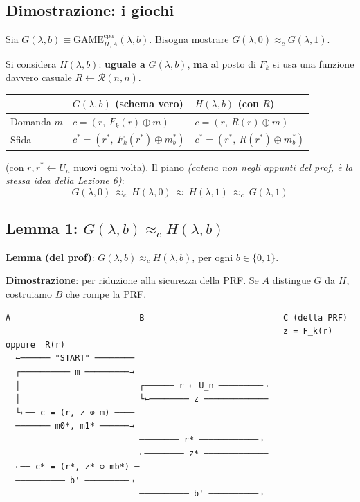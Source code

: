 \subsection{Dimostrazione: i giochi}

Sia \(G(\lambda, b) \equiv \text{GAME}^{\text{cpa}}_{\Pi, A}(\lambda, b)\). Bisogna mostrare \(G(\lambda, 0) \approx_c G(\lambda, 1)\).

Si considera \(H(\lambda, b)\): \textbf{uguale a} \(G(\lambda, b)\), \textbf{ma} al posto di \(F_k\) si usa una funzione davvero casuale \(R \leftarrow \mathcal{R}(n, n)\).

\begin{center}
\begin{tabular}{lll}
\toprule
 & \(G(\lambda, b)\) (schema vero) & \(H(\lambda, b)\) (con \(R\)) \\
\midrule
Domanda \(m\) & \(c = (r,\ F_k(r) \oplus m)\) & \(c = (r,\ R(r) \oplus m)\) \\
Sfida & \(c^* = (r^*,\ F_k(r^*) \oplus m_b^*)\) & \(c^* = (r^*,\ R(r^*) \oplus m_b^*)\) \\
\bottomrule
\end{tabular}
\end{center}

(con \(r, r^* \leftarrow U_n\) nuovi ogni volta). Il piano \emph{(catena non negli appunti del prof, è la stessa idea della Lezione 6)}:
\[
G(\lambda, 0) \ \approx_c\ H(\lambda, 0) \ \approx\ H(\lambda, 1) \ \approx_c\ G(\lambda, 1)
\]

\subsection{Lemma 1: \texorpdfstring{\(G(\lambda, b) \approx_c H(\lambda, b)\)}{G ≈c H}}

\textbf{Lemma (del prof)}: \(G(\lambda, b) \approx_c H(\lambda, b)\), per ogni \(b \in \{0, 1\}\).

\textbf{Dimostrazione}: per riduzione alla sicurezza della PRF. Se \(A\) distingue \(G\) da \(H\), costruiamo \(B\) che rompe la PRF.

\begin{verbatim}
A                          B                            C (della PRF)
                                                        z = F_k(r)  oppure  R(r)
  ←────── "START" ────────
  ┌────────── m ─────────→
  │                        ┌────── r ← U_n ─────────→
  │                        └←──────── z ─────────────
  └←── c = (r, z ⊕ m) ────
  ─────── m0*, m1* ──────→
                           ──────── r* ────────────→
                           ←──────── z* ─────────────
  ←── c* = (r*, z* ⊕ mb*) ─
  ────────── b' ─────────→
                           ────────── b' ──────────→
\end{verbatim}

